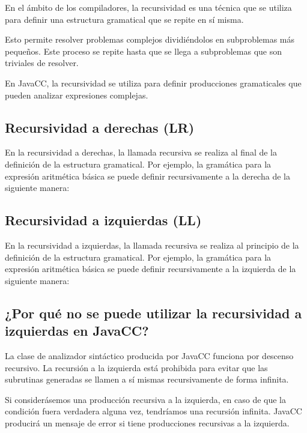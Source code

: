 En el ámbito de los compiladores, la recursividad es una técnica que se utiliza para definir una estructura gramatical que se repite en sí misma.

Esto permite resolver problemas complejos dividiéndolos en subproblemas más pequeños. Este proceso se repite hasta que se llega a subproblemas que son triviales de resolver.

En JavaCC, la recursividad se utiliza para definir producciones gramaticales que pueden analizar expresiones complejas.

\subsection{Recursividad a derechas (LR)}
En la recursividad a derechas, la llamada recursiva se realiza al final de la definición de la estructura gramatical. Por ejemplo, la gramática para la expresión aritmética básica se puede definir recursivamente a la derecha de la siguiente manera:

\lstset{inputencoding=utf8/latin1}


\subsection{Recursividad a izquierdas (LL)}

En la recursividad a izquierdas, la llamada recursiva se realiza al principio de la definición de la estructura gramatical. Por ejemplo, la gramática para la expresión aritmética básica se puede definir recursivamente a la izquierda de la siguiente manera:

\lstset{inputencoding=utf8/latin1}




\subsection{¿Por qué no se puede utilizar la recursividad a izquierdas en JavaCC?}
La clase de analizador sintáctico producida por JavaCC funciona por descenso recursivo. La recursión a la izquierda está prohibida para evitar que las subrutinas generadas se llamen a sí mismas recursivamente de forma infinita.

Si considerásemos una producción recursiva a la izquierda, en caso de que la  condición fuera verdadera alguna vez, tendríamos una recursión infinita.
JavaCC producirá un mensaje de error si tiene producciones recursivas a la izquierda.

